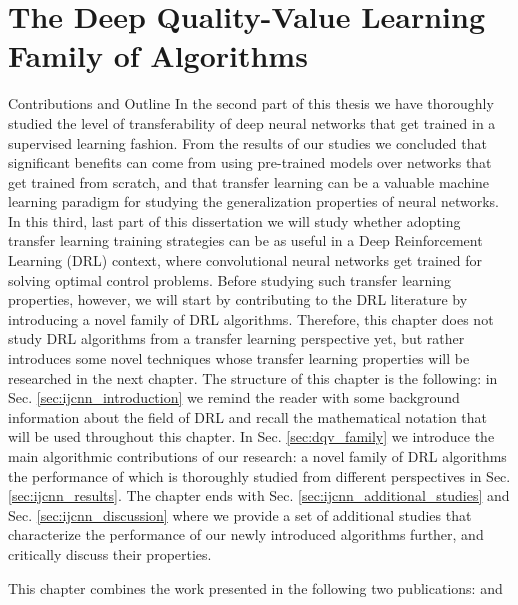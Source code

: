 
\chapter{The Deep Quality-Value Learning Family of Algorithms} %
\label{ch:dqv_family_of_algorithms} %


\begin{remark}{Contributions and Outline}
	In the second part of this thesis we have thoroughly studied the level of transferability of deep neural networks that get trained in a supervised learning fashion. From the results of our studies we concluded that significant benefits can come from using pre-trained models over networks that get trained from scratch, and that transfer learning can be a valuable machine learning paradigm for studying the generalization properties of neural networks. In this third, last part of this dissertation we will study whether adopting transfer learning training strategies can be as useful in a Deep Reinforcement Learning (DRL) context, where convolutional neural networks get trained for solving optimal control problems. Before studying such transfer learning properties, however, we will start by contributing to the DRL literature by introducing a novel family of DRL algorithms. Therefore, this chapter does not study DRL algorithms from a transfer learning perspective yet, but rather introduces some novel techniques whose transfer learning properties will be researched in the next chapter.
	The structure of this chapter is the following: in Sec. \ref{sec:ijcnn_introduction} we remind the reader with some background information about the field of DRL and recall the mathematical notation that will be used throughout this chapter. In Sec. \ref{sec:dqv_family} we introduce the main algorithmic contributions of our research: a novel family of DRL algorithms the performance of which is thoroughly studied from different perspectives in Sec. \ref{sec:ijcnn_results}. The chapter ends with Sec. \ref{sec:ijcnn_additional_studies} and Sec. \ref{sec:ijcnn_discussion} where we provide a set of additional studies that characterize the performance of our newly introduced algorithms further, and critically discuss their properties. 
\vspace{5mm}

This chapter combines the work presented in the following two publications: \citet{sabatelli2018deepqv} and \citet{sabatelli2020deep}
\end{remark}

